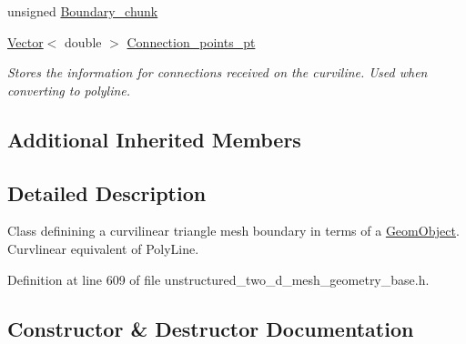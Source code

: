 \begin{DoxyCompactItemize}
unsigned \hyperlink{classoomph_1_1TriangleMeshCurviLine_aa526197f2a3eb9d7cb024eeaf7262051}{Boundary\+\_\+chunk}
\item 
\hyperlink{classoomph_1_1Vector}{Vector}$<$ double $>$ \hyperlink{classoomph_1_1TriangleMeshCurviLine_a33be954c8f4d0a0cd0243deac7ae10da}{Connection\+\_\+points\+\_\+pt}
\begin{DoxyCompactList}\small\item\em Stores the information for connections received on the curviline. Used when converting to polyline. \end{DoxyCompactList}\end{DoxyCompactItemize}
\subsection*{Additional Inherited Members}


\subsection{Detailed Description}
Class definining a curvilinear triangle mesh boundary in terms of a \hyperlink{classoomph_1_1GeomObject}{Geom\+Object}. Curvlinear equivalent of Poly\+Line. 

Definition at line 609 of file unstructured\+\_\+two\+\_\+d\+\_\+mesh\+\_\+geometry\+\_\+base.\+h.



\subsection{Constructor \& Destructor Documentation}
\mbox{\label{classoomph_1_1TriangleMeshCurviLine_aa31bdc0d13e7d8851eced042a471ecdf}} 
